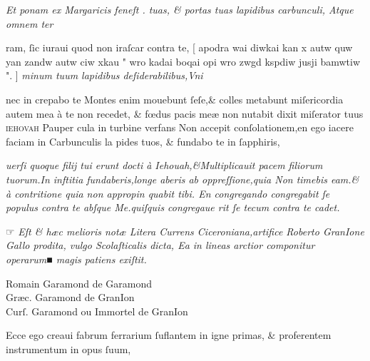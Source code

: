 \documentclass{article}
\newcommand{\threecolumntypefacenames}[3]{\begin{multicols}{3}
		\tiny
		\hfill \qquad \qquad \qquad \qquad #1\hspace*{\fill}\\
		\columnbreak
		\hfill #2\hspace*{\fill}\\
		\columnbreak
		\hfill #3\qquad \qquad \qquad \qquad \hspace*{\fill}
\end{multicols}}
\begin{document}
{\begin{multicols}{2}
	\columnbreak
	\justifying
	\noindent
	\textit{Et ponam ex {M}argaricis feneſt . tuas, \& portas tuas lapidibus carbunculi, Atque omnem ter\linebreak}
\end{multicols}
\fontsize{7}{8}\selectfont
\vspace{-2.5\baselineskip}
\noindent ram, ſic iuraui quod non iraſcar contra te, [ %
		{\grecs apodra wai diwkai kan x autw quw yan zandw autw ciw xkau " wro kadai boqai opi wro zwgd kspdiw jusji bamwtiw ".} ] \textit{minum tuum lapidibus deſiderabilibus,Vni\linebreak}
\vspace{-2.55\baselineskip}
\begin{multicols}{2}
	\fontsize{7}{8}\selectfont
	\justifying
	\noindent nec in crepabo te Montes enim mouebunt ſeſe,\& colles metabunt miſericordia autem mea\linebreak
	\`a te non recedet, \& f\oe{}dus pacis me\ae{} non nutabit dixit miſerator tuus \textsc{ iehovah} Pauper\linebreak
	cula in turbine verfans Non accepit conſolationem,en ego iacere faciam in Carbunculis la\linebreak
	pides tuos, \& fundabo te in ſapphiris,

	\columnbreak
	\justifying
	\noindent
	\textit{uerſi quoque filij tui erunt docti \`a Iehouah,\&Multiplicauit pacem filiorum tuorum.In inftitia\linebreak
	fundaberis,longe aberis ab oppreſſione,quia Non timebis eam.\& \`a contritione quia non appropin\linebreak
	quabit tibi. {E}n congregando congregabit ſe populus contra te abſque {M}e.quiſquis congregaue\linebreak
	rit ſe tecum contra te cadet.}
\end{multicols}
\vspace{-1\baselineskip}
\noindent{}  \normalsize ☞ \fontsize{6}{7}\selectfont\textit{Eſt \& h\ae{}c melioris not\ae{} Litera Currens Ciceroniana,artifice Roberto GranIone Gallo prodita, vulgo Scolaſticalis dicta, Ea in lineas arctior componitur operarum■ magis patiens exiſtit.}
\vspace{-1.5\baselineskip}
\threecolumntypefacenames{Romain Garamond de Garamond}{Gr\ae{}c. Garamond de GranIon}{Curſ. Garamond ou Immortel de GranIon}
\vspace{-3\baselineskip}
\begin{multicols}{2}
	\fontsize{6.25}{7}\selectfont
	\justifying
	\noindent \quad Ecce ego creaui fabrum ferrarium ſuflantem in igne primas, \& proferentem instrumentum in opus ſuum,\\


\end{multicols}}
\end{document}

